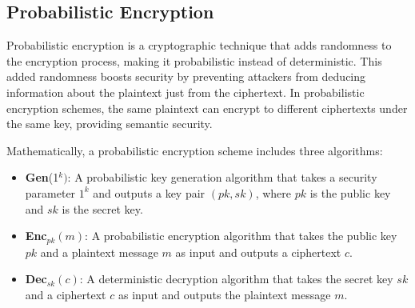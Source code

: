 \documentclass[12pt]{book} %
\begin{document}
\subsection{Probabilistic Encryption}

Probabilistic encryption is a cryptographic technique that adds randomness to the encryption process, making it probabilistic instead of deterministic. This added randomness boosts security by preventing attackers from deducing information about the plaintext just from the ciphertext. In probabilistic encryption schemes, the same plaintext can encrypt to different ciphertexts under the same key, providing semantic security.

Mathematically, a probabilistic encryption scheme includes three algorithms:
\begin{itemize}
    \item \textbf{Gen}(1\(^{k})\): A probabilistic key generation algorithm that takes a security parameter \(1^k\) and outputs a key pair \((pk, sk)\), where \(pk\) is the public key and \(sk\) is the secret key.
    \item \textbf{Enc}\(_{pk}(m)\): A probabilistic encryption algorithm that takes the public key \(pk\) and a plaintext message \(m\) as input and outputs a ciphertext \(c\).
    \item \textbf{Dec}\(_{sk}(c)\): A deterministic decryption algorithm that takes the secret key \(sk\) and a ciphertext \(c\) as input and outputs the plaintext message \(m\).
\end{itemize}
\end{document}
